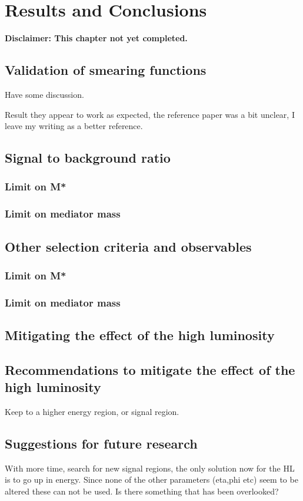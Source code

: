 \chapter{Results and Conclusions}\label{cha:res}
\textbf{Disclaimer: This chapter not yet completed.}
\section{Validation of smearing functions}
Have some discussion.

Result they appear to work as expected, the reference paper was a bit unclear, I leave my writing as a better reference.

\section{Signal to background ratio}
\subsection{Limit on M*}
\subsection{Limit on mediator mass}

\section{Other selection criteria and observables}
\subsection{Limit on M*}
\subsection{Limit on mediator mass}
\section{Mitigating the effect of the high luminosity}

\section{Recommendations to mitigate the effect of the high luminosity}
Keep to a higher energy region, or signal region.
\section{Suggestions for future research}
With more time, search for new signal regions, the only solution now for the HL is to go up in energy. Since none of the other parameters (eta,phi etc) seem to be altered these can not be used. Is there something that has been overlooked?

